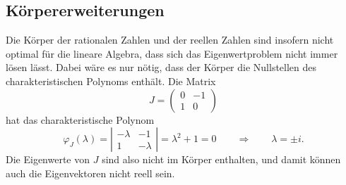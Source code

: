 \subsection{Körpererweiterungen}
Die Körper der rationalen Zahlen und der reellen Zahlen sind insofern
nicht optimal für die lineare Algebra, dass sich das Eigenwertproblem
nicht immer lösen lässt.
Dabei wäre es nur nötig, dass der Körper die Nullstellen des
charakteristischen Polynoms enthält. 
Die Matrix
\[
J=\begin{pmatrix}0&-1\\1&0\end{pmatrix}
\]
hat das charakteristische Polynom
\[
\varphi_{J}(\lambda)
=
\left|\begin{matrix}-\lambda&-1\\1&-\lambda\end{matrix}\right|
=
\lambda^2+1 = 0
\qquad\Rightarrow\qquad
\lambda=\pm i.
\]
Die Eigenwerte von $J$ sind also nicht im Körper enthalten,
und damit können auch die Eigenvektoren nicht reell sein.

